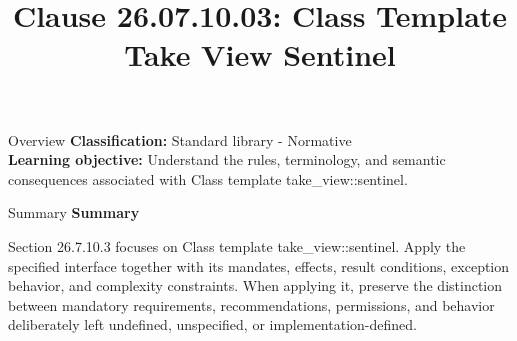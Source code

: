 \documentclass[10pt,letterpaper]{article}
\title{Clause 26.07.10.03: Class Template Take View Sentinel}
\author{}
\date{}
\begin{document}
\maketitle
\begin{CornellOverviewBox}{Overview}
\textbf{Classification:} Standard library - Normative\\[2pt]
\textbf{Learning objective:} Understand the rules, terminology, and semantic consequences associated with Class template take\_view::sentinel.
\end{CornellOverviewBox}\begin{CornellSummaryBox}{Summary}
{\sffamily\bfseries\color{Accent} Summary}\par\vspace{3pt}Section 26.7.10.3 focuses on Class template take\_view::sentinel. Apply the specified interface together with its mandates, effects, result conditions, exception behavior, and complexity constraints. When applying it, preserve the distinction between mandatory requirements, recommendations, permissions, and behavior deliberately left undefined, unspecified, or implementation-defined.
\end{CornellSummaryBox}
\end{document}
